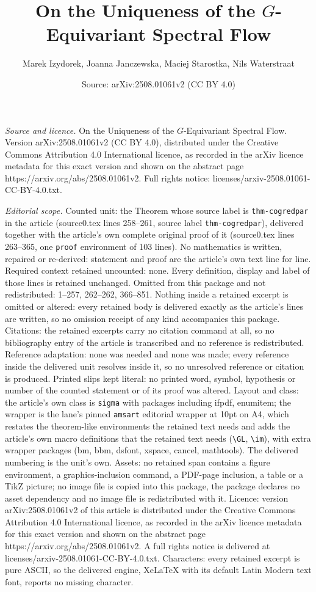 \documentclass[10pt,a4paper]{amsart}
\title[On the Uniqueness of the $G$-Equivariant Spectral Flow]{On the Uniqueness of the $G$-Equivariant Spectral Flow}
\author{Marek Izydorek, Joanna Janczewska, Maciej Starostka, Nils Waterstraat}
\date{Source: arXiv:2508.01061v2 (CC BY 4.0)}
\begin{document}
\maketitle

\noindent\emph{Source and licence.} On the Uniqueness of the $G$-Equivariant Spectral Flow. Version arXiv:2508.01061v2 (CC BY 4.0), distributed under the Creative Commons Attribution 4.0 International licence, as recorded in the arXiv licence metadata for this exact version and shown on the abstract page https://arxiv.org/abs/2508.01061v2. Full rights notice: licenses/arxiv-2508.01061-CC-BY-4.0.txt.\par\smallskip

\noindent\textit{Editorial scope.} Counted unit: the Theorem whose source label is \texttt{thm-cogredpar} in the article (source0.tex lines 258--261, source label \texttt{thm-cogredpar}), delivered together with the article's own complete original proof of it (source0.tex lines 263--365, one \texttt{proof} environment of 103 lines). No mathematics is written, repaired or re-derived: statement and proof are the article's own text line for line. Required context retained uncounted: none. Every definition, display and label of those lines is retained unchanged. Omitted from this package and not redistributed: 1--257, 262--262, 366--851. Nothing inside a retained excerpt is omitted or altered: every retained body is delivered exactly as the article's lines are written, so no omission receipt of any kind accompanies this package. Citations: the retained excerpts carry no citation command at all, so no bibliography entry of the article is transcribed and no reference is redistributed. Reference adaptation: none was needed and none was made; every reference inside the delivered unit resolves inside it, so no unresolved reference or citation is produced. Printed slips kept literal: no printed word, symbol, hypothesis or number of the counted statement or of its proof was altered. Layout and class: the article's own class is \texttt{sigma} with packages including ifpdf, enumitem; the wrapper is the lane's pinned \texttt{amsart} editorial wrapper at 10pt on A4, which restates the theorem-like environments the retained text needs and adds the article's own macro definitions that the retained text needs (\texttt{\textbackslash GL}, \texttt{\textbackslash im}), with extra wrapper packages (bm, bbm, dsfont, xspace, cancel, mathtools). The delivered numbering is the unit's own. Assets: no retained span contains a figure environment, a graphics-inclusion command, a PDF-page inclusion, a table or a TikZ picture; no image file is copied into this package, the package declares no asset dependency and no image file is redistributed with it. Licence: version arXiv:2508.01061v2 of this article is distributed under the Creative Commons Attribution 4.0 International licence, as recorded in the arXiv licence metadata for this exact version and shown on the abstract page https://arxiv.org/abs/2508.01061v2. A full rights notice is delivered at licenses/arxiv-2508.01061-CC-BY-4.0.txt. Characters: every retained excerpt is pure ASCII, so the delivered engine, XeLaTeX with its default Latin Modern text font, reports no missing character.
\end{document}
